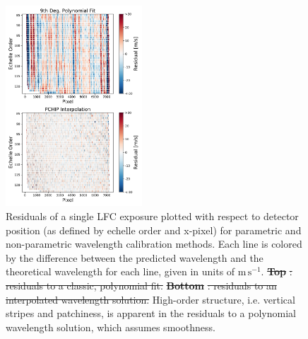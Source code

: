\documentclass[twocolumn,table,xcolor,trackchanges]{aastex63} %
\newcommand{\mps}{\mathrm{m\,s^{-1}}}
\providecommand{\DIFadd}[1]{{\protect\color{blue}\uwave{#1}}} %
\providecommand{\DIFdel}[1]{{\protect\color{red}\sout{#1}}}                      %
\providecommand{\DIFaddFL}[1]{\DIFadd{#1}} %
\providecommand{\DIFdelFL}[1]{\DIFdel{#1}} %
\providecommand{\DIFaddbeginFL}{} %
\providecommand{\DIFaddendFL}{} %
\providecommand{\DIFdelbeginFL}{} %
\providecommand{\DIFdelendFL}{} %
\begin{document}
\begin{figure}[h]
\centering
\includegraphics[width=0.455\textwidth]{Figures/lineResids2D_col.pdf}
\caption{Residuals of a single LFC exposure plotted with respect to detector position (as defined by echelle order and x-pixel) for parametric \DIFaddbeginFL \DIFaddFL{(top) }\DIFaddendFL and non-parametric \DIFaddbeginFL \DIFaddFL{(bottom) }\DIFaddendFL wavelength calibration methods.  Each line is colored by the difference between the predicted wavelength and the theoretical wavelength for each line, given in units of $\mps$.  \DIFdelbeginFL \textbf{\DIFdelFL{Top}}%
\DIFdelFL{: residuals to a classic, polynomial fit.  }\textbf{\DIFdelFL{Bottom}}%
\DIFdelFL{: residuals to an interpolated wavelength solution.  }\DIFdelendFL High-order structure, i.e. vertical stripes and patchiness, is apparent in the residuals to a polynomial wavelength solution, which assumes smoothness.}
\label{fig:resid2d}
\end{figure}
\end{document}
